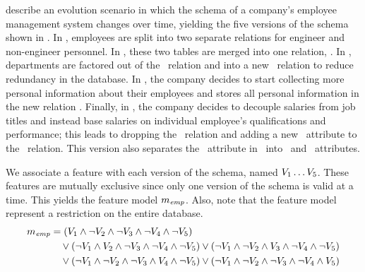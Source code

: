 

\citet{prima08Moon} describe an evolution scenario in which the schema of a
company's employee management system changes over time, yielding the five
versions of the schema shown in .
%
In \vOne, employees are split into two separate relations for
engineer and non-engineer personnel.
%
In \vTwo, these two tables are merged into one relation, \empacct.
%
In \vThree, departments are factored out of the \empacct\ relation and
into a new \dept\ relation to reduce redundancy in the database.
%
In \vFour, the company decides to start collecting more personal
information about their employees and stores all personal information in the
new relation \empbio.
%
Finally, in \vFive, the company decides to decouple salaries from
job titles and instead base salaries on individual employee's qualifications
and performance; this leads to dropping the \job\ relation and adding a new
\salary\ attribute to the \empacct\ relation. This version also separates the
\name\ attribute in \empbio\ into \fname\ and \lname\ attributes.


We associate a feature with each version of the schema, named 
$\vOne\ldots\vFive$.
%
These features are mutually exclusive since only one version of the
schema is valid at a time. This yields the  feature model
$\fModel_\employee$.
%
 Also, note that the feature model represent a restriction on the entire
 database.
%
\begin{align*}
\fModel_\employee
  &=   \left(\vOne\wedge\neg\vTwo\wedge\neg\vThree\wedge\neg\vFour\wedge\neg\vFive\right)\\
  &\quad
  \vee\left(\neg\vOne\wedge\vTwo\wedge\neg\vThree\wedge\neg\vFour\wedge\neg\vFive\right)
  \vee\left(\neg\vOne\wedge\neg\vTwo\wedge\vThree\wedge\neg\vFour\wedge\neg\vFive\right)\\
   &\quad
   \vee\left(\neg\vOne\wedge\neg\vTwo\wedge\neg\vThree\wedge\vFour\wedge\neg\vFive\right)
  \vee\left(\neg\vOne\wedge\neg\vTwo\wedge\neg\vThree\wedge\neg\vFour\wedge\vFive\right)
\end{align*}



